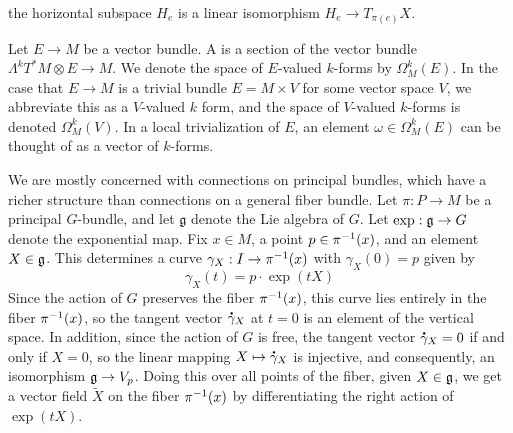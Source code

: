 the horizontal subspace $H_e$ is a linear isomorphism $H_e \to T_{\pi(e)}X$.
%
\begin{defn}
Let $E \to M$ be a vector bundle. A  is a section of
the vector bundle $\Lambda^kT^*M \otimes E \to M$. We denote the space of
$E$-valued $k$-forms by $\Omega_M^k(E)$. In the case that $E \to M$ is a
trivial bundle $E = M \times V$ for some vector space $V$, we abbreviate
this as a $V$-valued $k$ form, and the space of $V$-valued $k$-forms is denoted
$\Omega_M^k(V)$. In a local trivialization of $E$, an element
$\omega \in \Omega^k_M(E)$ can be thought of as a vector of $k$-forms.
\end{defn}
%
We are mostly concerned with connections on principal bundles, which have a
richer structure than connections on a general fiber bundle. Let $\pi : P \to M$
be a principal $G$-bundle, and let $\mathfrak{g}$ denote the Lie algebra of $G$.
Let $\exp : \mathfrak{g} \to G$ denote the exponential map. Fix $x \in M$, a point
$p \in \pi^{-1}(x)$, and an element $X \in \mathfrak{g}$. This determines a curve
$\gamma_X : I \to \pi^{-1}(x)$ with $\gamma_X(0) = p$ given by
\[
\gamma_X(t) = p \cdot \exp(tX)
\]
Since the action of $G$ preserves the fiber $\pi^{-1}(x)$, this curve lies
entirely in the fiber $\pi^{-1}(x)$, so the tangent vector $\accentset{\mbox{\large\bfseries .}}{\gamma}_X$
at $t = 0$ is an element of the vertical space. In addition, since the
action of $G$ is free, the tangent vector $\accentset{\mbox{\large\bfseries .}}{\gamma}_X = 0$ if and only if
$X = 0$, so the linear mapping $X \mapsto \accentset{\mbox{\large\bfseries .}}{\gamma}_X$ is injective, and
consequently, an isomorphism $\mathfrak{g} \to V_p$. Doing this over all points of the
fiber, given $X \in \mathfrak{g}$, we get a vector field $\tilde{X}$
on the fiber $\pi^{-1}(x)$ by differentiating the right action of $\exp(tX)$.

